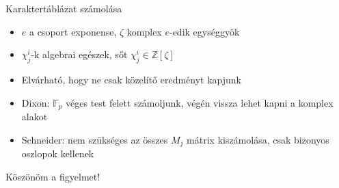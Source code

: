 \documentclass[mathserif]{beamer}
\begin{document}
\begin{frame}{Karaktertáblázat számolása}
\begin{itemize}
\item $e$ a csoport exponense, $\zeta$ komplex $e$-edik egységgyök
\item $\chi^i_j$-k algebrai egészek, sőt $\chi^i_j \in \mathbb{Z}[\zeta]$
\item Elvárható, hogy ne csak közelítő eredményt kapjunk
\item Dixon: $\mathbb{F}_p$ véges test felett számoljunk, végén vissza lehet kapni a komplex alakot
\item Schneider: nem szükséges az összes $M_j$ mátrix kiszámolása, csak bizonyos oszlopok kellenek
\end{itemize}
\end{frame}

\begin{frame}{}
\hfill\huge{Köszönöm a figyelmet!}\hfill\hfill
\end{frame}
\end{document}
